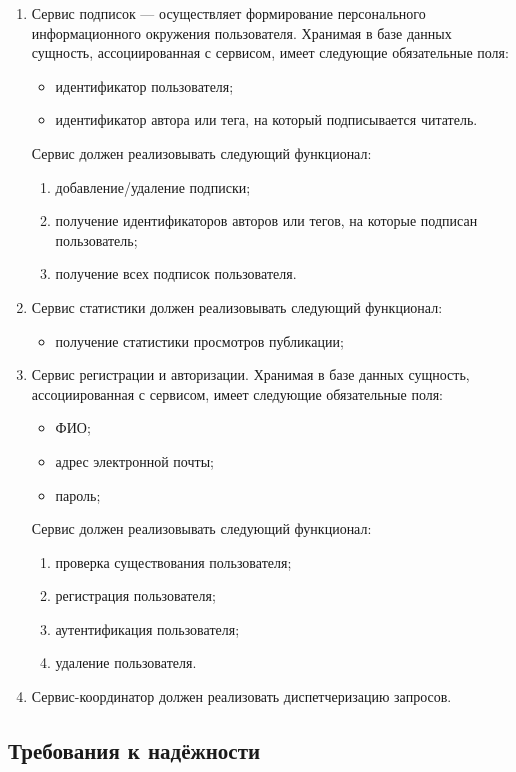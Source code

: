 \documentclass{bmstu-gost-7-32}
\begin{document}
\begin{enumerate}
	\item Сервис подписок — осуществляет формирование персонального информационного окружения пользователя.
	Хранимая в базе данных сущность, ассоциированная с сервисом, имеет следующие обязательные поля:
	\begin{itemize}
		\item идентификатор пользователя;
		\item идентификатор автора или тега, на который подписывается читатель.
	\end{itemize}
	Сервис должен реализовывать следующий функционал:
	\begin{enumerate}
		\item добавление/удаление подписки;
		\item получение идентификаторов авторов или тегов, на которые подписан пользователь;
		\item получение всех подписок пользователя.
	\end{enumerate}
	\item Сервис статистики должен реализовывать следующий функционал:
	\begin{itemize}
		\item получение статистики просмотров публикации;
	\end{itemize}
	\item Сервис регистрации и авторизации.
	Хранимая в базе данных сущность, ассоциированная с сервисом, имеет следующие обязательные поля:
	\begin{itemize}
		\item ФИО;
		\item адрес электронной почты;
		\item пароль;
	\end{itemize}
	Сервис должен реализовывать следующий функционал:
	\begin{enumerate}
		\item проверка существования пользователя;
		\item регистрация пользователя;
		\item аутентификация пользователя;
		\item удаление пользователя.
	\end{enumerate}
	\item Сервис-координатор должен реализовать диспетчеризацию запросов.
\end{enumerate}

\subsection{Требования к надёжности}
\end{document}
